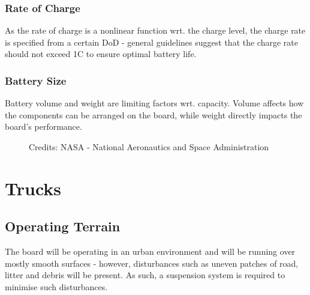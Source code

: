 \documentclass[journal,10pt]{IEEEtran}
\begin{document}
        \subsubsection{Rate of Charge}
            As the rate of charge is a nonlinear function wrt. the charge level, the charge rate is specified from a certain DoD - general guidelines suggest that the charge rate should not exceed 1C to ensure optimal battery life.
        \subsubsection{Battery Size}
        Battery volume and weight are limiting factors wrt. capacity. Volume affects how the components can be arranged on the board, while weight directly impacts the board's performance.    
            \begin{figure}[H]
                \centering
                \caption{Credits: NASA - National Aeronautics and Space Administration}
                \label{fig:Battery Size}
            \end{figure}
\section{Trucks}
    \subsection{Operating Terrain}
        The board will be operating in an urban environment and will be running over mostly smooth surfaces - however, disturbances such as uneven patches of road, litter and debris will be present. As such, a suspension system is required to minimise such disturbances.
\end{document}
